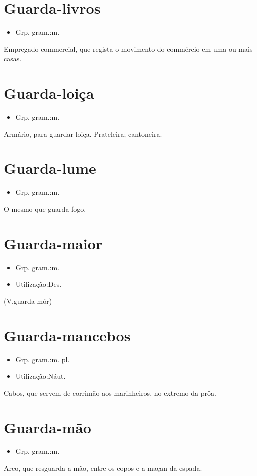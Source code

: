\section{Guarda-livros}
\begin{itemize}
\item {Grp. gram.:m.}
\end{itemize}
Empregado commercial, que regista o movimento do commércio em uma ou mais casas.
\section{Guarda-loiça}
\begin{itemize}
\item {Grp. gram.:m.}
\end{itemize}
Armário, para guardar loiça.
Prateleira; cantoneira.
\section{Guarda-lume}
\begin{itemize}
\item {Grp. gram.:m.}
\end{itemize}
O mesmo que \textunderscore guarda-fogo\textunderscore .
\section{Guarda-maior}
\begin{itemize}
\item {Grp. gram.:m.}
\end{itemize}
\begin{itemize}
\item {Utilização:Des.}
\end{itemize}
(V.guarda-mór)
\section{Guarda-mancebos}
\begin{itemize}
\item {Grp. gram.:m. pl.}
\end{itemize}
\begin{itemize}
\item {Utilização:Náut.}
\end{itemize}
Cabos, que servem de corrimão aos marinheiros, no extremo da prôa.
\section{Guarda-mão}
\begin{itemize}
\item {Grp. gram.:m.}
\end{itemize}
Arco, que resguarda a mão, entre os copos e a maçan da espada.
